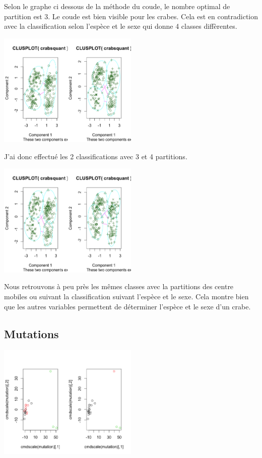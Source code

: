 \documentclass{article}\usepackage[]{graphicx}\usepackage[]{color}
\begin{document}
Selon le graphe ci dessous de la méthode du coude, le nombre optimal de partition est 3. Le coude est bien visible pour les crabes. Cela est en contradiction avec la classification selon l'espèce et le sexe qui donne 4 classes diffèrentes.  


\includegraphics[width=0.5\textwidth]{ex2_crab_3.png}

J'ai donc effectué les 2 classifications avec 3 et 4 partitions. 

\includegraphics[width=0.5\textwidth]{ex2_crab_4.png}

Nous retrouvons à peu près les mêmes classes avec la partitions des centre mobiles ou suivant la classification suivant l'espèce et le sexe. Cela montre bien que les autres variables permettent de déterminer l'espèce et le sexe d'un crabe. 



\subsection*{Mutations}

\includegraphics[width=0.5\textwidth]{ex2_mutation_2.png}
\end{document}
